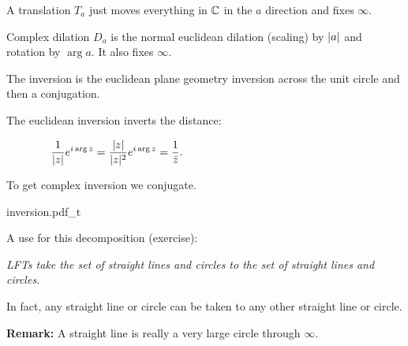 \documentclass[10pt,aspectratio=169]{beamer}
\begin{document}
\begin{frame}
A translation $T_a$ just moves everything in ${\mathbb{C}}$ in the $a$ direction and fixes
$\infty$.

\medskip
\pause

Complex dilation $D_a$ is the normal euclidean dilation (scaling) by
$\lvert {a} \rvert$ and rotation by $\arg a$.  It also fixes $\infty$.

\medskip
\pause

The inversion is the euclidean plane geometry inversion across the unit
circle and then a conjugation.

\medskip
\pause

The euclidean inversion inverts the distance:

\medskip

$\displaystyle
\qquad \qquad
\frac{1}{\lvert {z} \rvert} e^{i \arg z} = 
\frac{\lvert {z} \rvert}{\lvert {z} \rvert^2} e^{i \arg z} = \frac{1}{\bar{z}} .
$
\medskip

To get complex inversion we conjugate.

\vspace*{-0.97in}
\hspace*{3in}
{inversion.pdf_t}

\pause
\vspace*{-0.15in}

A use for this decomposition (exercise):

\emph{LFTs take the set of straight lines and circles to
the set of
straight lines and circles.}

\medskip
\pause

In fact, any straight line or circle
can be taken to any other straight line or circle.

\pause
\medskip

\textbf{Remark:} A straight line is really a very large circle through $\infty$.

\end{frame}
\end{document}
